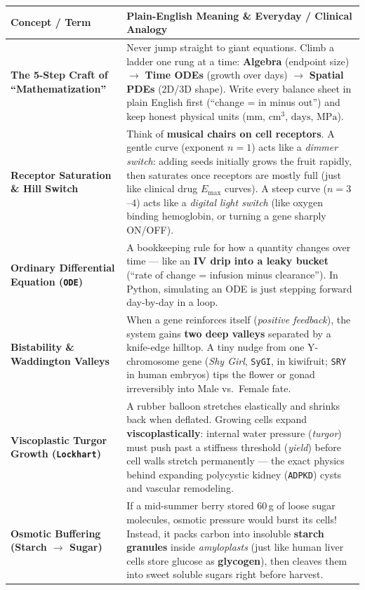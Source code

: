 \documentclass[10.5pt,a4paper]{article}
\begin{document}
\begin{table}[H]
\centering
\scriptsize
\renewcommand{\arraystretch}{1.18}
\begin{tabularx}{\textwidth}{L{3.55cm} Y}
\toprule
{}
\textbf{Concept / Term} & \textbf{Plain-English Meaning \& Everyday / Clinical Analogy} \\
\midrule
\textbf{The 5-Step Craft of ``Mathematization''} & Never jump straight to giant equations. Climb a ladder one rung at a time: \textbf{Algebra} (endpoint size) $\to$ \textbf{Time ODEs} (growth over days) $\to$ \textbf{Spatial PDEs} (2D/3D shape). Write every balance sheet in plain English first (``change = in minus out'') and keep honest physical units ($\text{mm}$, $\text{cm}^3$, $\text{days}$, $\text{MPa}$). \\
\textbf{Receptor Saturation \& Hill Switch} & Think of \textbf{musical chairs on cell receptors}. A gentle curve (exponent $n=1$) acts like a \emph{dimmer switch}: adding seeds initially grows the fruit rapidly, then saturates once receptors are mostly full (just like clinical drug $E_{\max}$ curves). A steep curve ($n=3$--$4$) acts like a \emph{digital light switch} (like oxygen binding hemoglobin, or turning a gene sharply ON/OFF). \\
\textbf{Ordinary Differential Equation (\texttt{ODE})} & A bookkeeping rule for how a quantity changes over time --- like an \textbf{IV drip into a leaky bucket} (``rate of change = infusion minus clearance''). In Python, simulating an ODE is just stepping forward day-by-day in a loop. \\
\textbf{Bistability \& Waddington Valleys} & When a gene reinforces itself (\emph{positive feedback}), the system gains \textbf{two deep valleys} separated by a knife-edge hilltop. A tiny nudge from one Y-chromosome gene (\emph{Shy Girl}, \texttt{SyGI}, in kiwifruit; \texttt{SRY} in human embryos) tips the flower or gonad irreversibly into Male vs.\ Female fate. \\
\textbf{Viscoplastic Turgor Growth (\texttt{Lockhart})} & A rubber balloon stretches elastically and shrinks back when deflated. Growing cells expand \textbf{viscoplastically}: internal water pressure (\emph{turgor}) must push past a stiffness threshold (\emph{yield}) before cell walls stretch permanently --- the exact physics behind expanding polycystic kidney (\texttt{ADPKD}) cysts and vascular remodeling. \\
\textbf{Osmotic Buffering (Starch $\to$ Sugar)} & If a mid-summer berry stored 60\,g of loose sugar molecules, osmotic pressure would burst its cells! Instead, it packs carbon into insoluble \textbf{starch granules} inside \emph{amyloplasts} (just like human liver cells store glucose as \textbf{glycogen}), then cleaves them into sweet soluble sugars right before harvest. \\

\end{tabularx}
\end{table}
\end{document}
